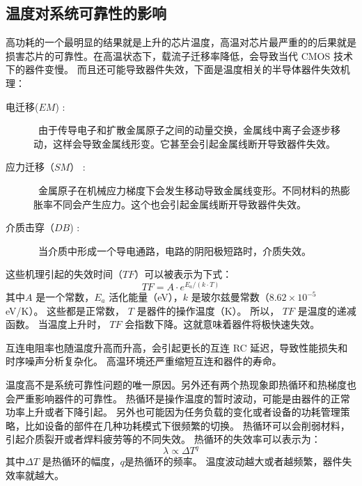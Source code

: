\subsection{温度对系统可靠性的影响}\label{sec:reliability}
高功耗的一个最明显的结果就是上升的芯片温度，高温对芯片最严重的的后果就是损害芯片的可靠性。在高温状态下，载流子迁移率降低，会导致当代 CMOS 技术下的器件变慢。
而且还可能导致器件失效，下面是温度相关的半导体器件失效机理\cite{jedec2003failure}：
\begin{description}
\item[电迁移($EM$) :] ~由于传导电子和扩散金属原子之间的动量交换，金属线中离子会逐步移动，这样会导致金属线形变。它甚至会引起金属线断开导致器件失效。
\item[应力迁移（$SM$） :] ~金属原子在机械应力梯度下会发生移动导致金属线变形。不同材料的热膨胀率不同会产生应力。这个也会引起金属线断开导致器件失效。
\item[介质击穿（$DB$) :] ~当介质中形成一个导电通路，电路的阴阳极短路时，介质失效。
\end{description}

这些机理引起的失效时间（$TF$）可以被表示为下式：
\begin{equation}
TF = A \cdot e^{E_a/(k \cdot T)}
\end{equation}
其中$A$ 是一个常数，$E_a$ 活化能量（eV），$k$ 是玻尔兹曼常数（$8.62 \times 10^{-5}$ eV/K）。
这些都是正常数， $T$ 是器件的操作温度（K）。
所以， $TF$ 是温度的递减函数。
当温度上升时， $TF$ 会指数下降。这就意味着器件将极快速失效。

互连电阻率也随温度升高而升高，会引起更长的互连 RC 延迟，导致性能损失和时序噪声分析复杂化。
高温环境还严重缩短互连和器件的寿命。

温度高不是系统可靠性问题的唯一原因。另外还有两个热现象即热循环和热梯度也会严重影响器件的可靠性。
热循环是操作温度的暂时波动，可能是由器件的正常功率上升或者下降引起。
另外也可能因为任务负载的变化或者设备的功耗管理策略，比如设备的部件在几种功耗模式下很频繁的切换。
热循环可以会削弱材料，引起介质裂开或者焊料疲劳等的不同失效。
热循环的失效率可以表示为：
\begin{equation}
\lambda \propto \Delta T^q
\end{equation}
其中$\Delta T$ 是热循环的幅度，$q$是热循环的频率。
温度波动越大或者越频繁，器件失效率就越大。

